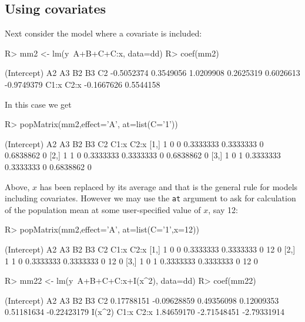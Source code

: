 \documentclass[11pt]{article}
\def\code#1{\texttt{#1}}
\begin{document}
\subsection{Using covariates}

Next consider the model where a covariate is included:
\begin{Schunk}
\begin{Sinput}
R> mm2 <- lm(y~A+B+C+C:x, data=dd)
R> coef(mm2)
\end{Sinput}
\begin{Soutput}
(Intercept)          A2          A3          B2          B3          C2 
 -0.5052374   0.3549056   1.0209908   0.2625319   0.6026613  -0.9749379 
       C1:x        C2:x 
 -0.1667626   0.5544158 
\end{Soutput}
\end{Schunk}

In this case we get
\begin{Schunk}
\begin{Sinput}
R> popMatrix(mm2,effect='A', at=list(C='1'))
\end{Sinput}
\begin{Soutput}
     (Intercept) A2 A3        B2        B3 C2      C1:x C2:x
[1,]           1  0  0 0.3333333 0.3333333  0 0.6838862    0
[2,]           1  1  0 0.3333333 0.3333333  0 0.6838862    0
[3,]           1  0  1 0.3333333 0.3333333  0 0.6838862    0
\end{Soutput}
\end{Schunk}

Above, $x$ has been replaced by its average and that is the general
rule for models including covariates. However we may use the \code{at}
argument to ask for calculation of the population mean at some
user-specified value of $x$, say 12:
\begin{Schunk}
\begin{Sinput}
R> popMatrix(mm2,effect='A', at=list(C='1',x=12))
\end{Sinput}
\begin{Soutput}
     (Intercept) A2 A3        B2        B3 C2 C1:x C2:x
[1,]           1  0  0 0.3333333 0.3333333  0   12    0
[2,]           1  1  0 0.3333333 0.3333333  0   12    0
[3,]           1  0  1 0.3333333 0.3333333  0   12    0
\end{Soutput}
\end{Schunk}

\begin{Schunk}
\begin{Sinput}
R> mm22 <- lm(y~A+B+C+C:x+I(x^2), data=dd)
R> coef(mm22)
\end{Sinput}
\begin{Soutput}
(Intercept)          A2          A3          B2          B3          C2 
 0.17788151 -0.09628859  0.49356098  0.12009353  0.51181634 -0.22423179 
     I(x^2)        C1:x        C2:x 
 1.84659170 -2.71548451 -2.79331914 
\end{Soutput}
\end{Schunk}
\end{document}
